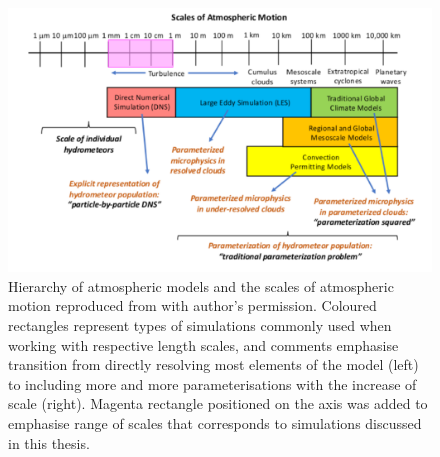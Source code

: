 

\begin{figure}
\centering
\includegraphics[width=13cm]{figures/0-01_atmo-scales.png}
\caption{
Hierarchy of atmospheric models and the scales of atmospheric motion reproduced from \textcite{Morrison2020} with author's permission.
Coloured rectangles represent types of simulations commonly used when working with respective length scales, and comments emphasise transition from directly resolving most elements of the model (left) to including more and more parameterisations with the increase of scale (right).
Magenta rectangle positioned on the axis was added to emphasise range of scales that corresponds to simulations discussed in this thesis.}
\label{fig:atmo-scales}
\end{figure}





